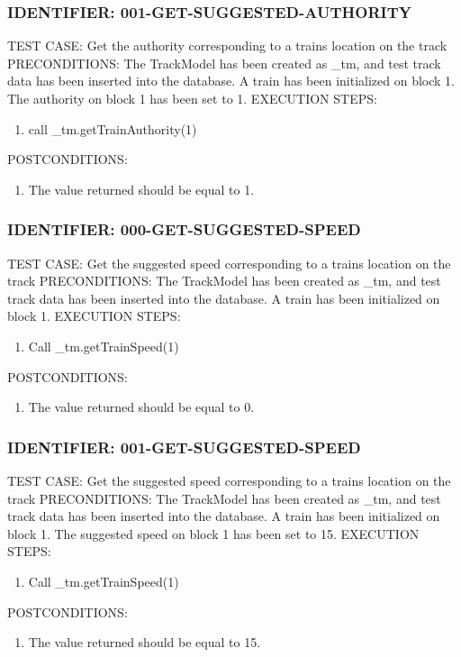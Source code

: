 \documentclass{scrreprt}
\begin{document}
\subsubsection{IDENTIFIER: 001-GET-SUGGESTED-AUTHORITY}
TEST CASE: Get the authority corresponding to a trains location on the track
PRECONDITIONS: The TrackModel has been created as _tm, and test track data has been inserted into the database. A train has been initialized on block 1. The authority on block 1 has been set to 1.
EXECUTION STEPS:
\begin{enumerate}
	\item call _tm.getTrainAuthority(1)
\end{enumerate}
POSTCONDITIONS:
\begin{enumerate}
	\item The value returned should be equal to 1.
\end{enumerate}

\subsubsection{IDENTIFIER: 000-GET-SUGGESTED-SPEED}
TEST CASE: Get the suggested speed corresponding to a trains location on the track
PRECONDITIONS: The TrackModel has been created as _tm, and test track data has been inserted into the database. A train has been initialized on block 1.
EXECUTION STEPS:
\begin{enumerate}
	\item Call _tm.getTrainSpeed(1)
\end{enumerate}
POSTCONDITIONS:
\begin{enumerate}
	\item The value returned should be equal to 0.
\end{enumerate}

\subsubsection{IDENTIFIER: 001-GET-SUGGESTED-SPEED}
TEST CASE: Get the suggested speed corresponding to a trains location on the track
PRECONDITIONS: The TrackModel has been created as _tm, and test track data has been inserted into the database. A train has been initialized on block 1. The suggested speed on block 1 has been set to 15.
EXECUTION STEPS:
\begin{enumerate}
	\item Call _tm.getTrainSpeed(1)
\end{enumerate}
POSTCONDITIONS:
\begin{enumerate}
	\item The value returned should be equal to 15.
\end{enumerate}
\end{document}
